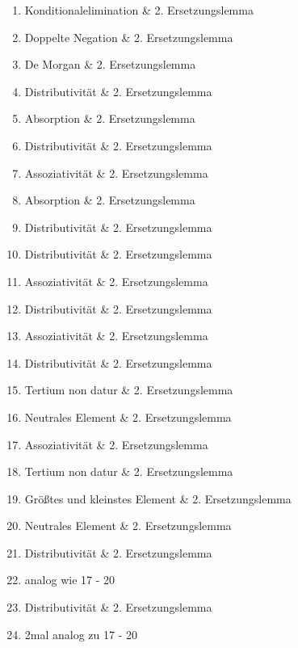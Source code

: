 \documentclass[12pt,a4paper]{scrartcl}
\begin{document}
\begin{enumerate} 
  \item Konditionalelimination \& 2. Ersetzungslemma
  \item Doppelte Negation \& 2. Ersetzungslemma
  \item De Morgan \& 2. Ersetzungslemma
  \item Distributivität \& 2. Ersetzungslemma
  \item Absorption \& 2. Ersetzungslemma
  \item Distributivität \& 2. Ersetzungslemma
  \item Assoziativität \& 2. Ersetzungslemma
  \item Absorption \& 2. Ersetzungslemma
  \item Distributivität \& 2. Ersetzungslemma
  \item Distributivität \& 2. Ersetzungslemma
  \item Assoziativität \& 2. Ersetzungslemma
  \item Distributivität \& 2. Ersetzungslemma
  \item Assoziativität \& 2. Ersetzungslemma
  \item Distributivität \& 2. Ersetzungslemma
  \item Tertium non datur \& 2. Ersetzungslemma
  \item Neutrales Element \& 2. Ersetzungslemma
  \item Assoziativität \& 2. Ersetzungslemma
  \item Tertium non datur \& 2. Ersetzungslemma
  \item Größtes und kleinstes Element \& 2. Ersetzungslemma
  \item Neutrales Element \& 2. Ersetzungslemma
  \item Distributivität \& 2. Ersetzungslemma
  \item analog wie 17 - 20
  \item Distributivität \& 2. Ersetzungslemma
  \item 2mal analog zu 17 - 20
\end{enumerate}
\end{document}
